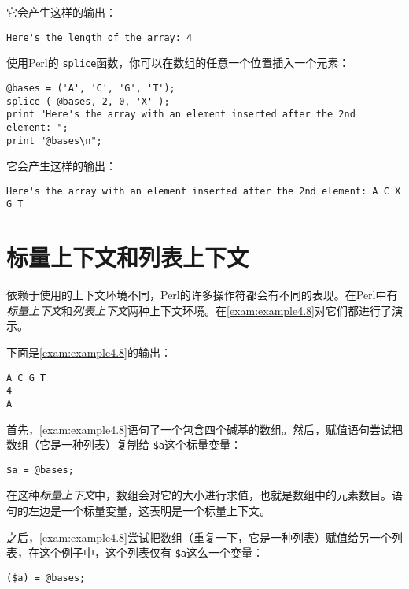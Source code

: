 它会产生这样的输出：

\begin{lstlisting}
Here's the length of the array: 4
\end{lstlisting}

使用Perl的 \verb|splice|函数，你可以在数组的任意一个位置插入一个元素：

\begin{lstlisting}
@bases = ('A', 'C', 'G', 'T');
splice ( @bases, 2, 0, 'X' );
print "Here's the array with an element inserted after the 2nd element: ";
print "@bases\n";
\end{lstlisting}

它会产生这样的输出：

\begin{lstlisting}
Here's the array with an element inserted after the 2nd element: A C X G T
\end{lstlisting}

\section{标量上下文和列表上下文}
依赖于使用的上下文环境不同，Perl的许多操作符都会有不同的表现。在Perl中有\textit{标量上下文}和\textit{列表上下文}两种上下文环境。在\autoref{exam:example4.8}对它们都进行了演示。



下面是\autoref{exam:example4.8}的输出：

\begin{lstlisting}
A C G T
4
A
\end{lstlisting}

首先，\autoref{exam:example4.8}语句了一个包含四个碱基的数组。然后，赋值语句尝试把数组（它是一种列表）复制给 \verb|$a|这个标量变量： 

\begin{lstlisting}
$a = @bases;
\end{lstlisting}

在这种\textit{标量上下文}中，数组会对它的大小进行求值，也就是数组中的元素数目。语句的左边是一个标量变量，这表明是一个标量上下文。

之后，\autoref{exam:example4.8}尝试把数组（重复一下，它是一种列表）赋值给另一个列表，在这个例子中，这个列表仅有 \verb|$a|这么一个变量：

\begin{lstlisting}
($a) = @bases;
\end{lstlisting}

